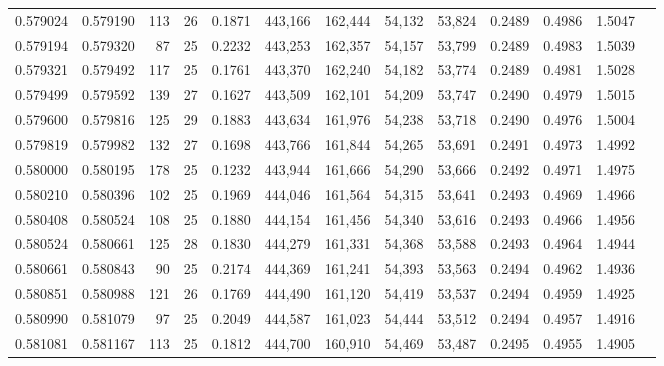\begin{tabular}{rrrrrrrrrrrrr}
0.579024 & 0.579190 &   113 &  26 &                                     0.1871 & 443,166 & 162,444 &  54,132 &  53,824 & 0.2489 & 0.4986 & 1.5047 \\
0.579194 & 0.579320 &    87 &  25 &                                     0.2232 & 443,253 & 162,357 &  54,157 &  53,799 & 0.2489 & 0.4983 & 1.5039 \\
0.579321 & 0.579492 &   117 &  25 &                                     0.1761 & 443,370 & 162,240 &  54,182 &  53,774 & 0.2489 & 0.4981 & 1.5028 \\
0.579499 & 0.579592 &   139 &  27 &                                     0.1627 & 443,509 & 162,101 &  54,209 &  53,747 & 0.2490 & 0.4979 & 1.5015 \\
0.579600 & 0.579816 &   125 &  29 &                                     0.1883 & 443,634 & 161,976 &  54,238 &  53,718 & 0.2490 & 0.4976 & 1.5004 \\
0.579819 & 0.579982 &   132 &  27 &                                     0.1698 & 443,766 & 161,844 &  54,265 &  53,691 & 0.2491 & 0.4973 & 1.4992 \\
0.580000 & 0.580195 &   178 &  25 &                                     0.1232 & 443,944 & 161,666 &  54,290 &  53,666 & 0.2492 & 0.4971 & 1.4975 \\
0.580210 & 0.580396 &   102 &  25 &                                     0.1969 & 444,046 & 161,564 &  54,315 &  53,641 & 0.2493 & 0.4969 & 1.4966 \\
0.580408 & 0.580524 &   108 &  25 &                                     0.1880 & 444,154 & 161,456 &  54,340 &  53,616 & 0.2493 & 0.4966 & 1.4956 \\
0.580524 & 0.580661 &   125 &  28 &                                     0.1830 & 444,279 & 161,331 &  54,368 &  53,588 & 0.2493 & 0.4964 & 1.4944 \\
0.580661 & 0.580843 &    90 &  25 &                                     0.2174 & 444,369 & 161,241 &  54,393 &  53,563 & 0.2494 & 0.4962 & 1.4936 \\
0.580851 & 0.580988 &   121 &  26 &                                     0.1769 & 444,490 & 161,120 &  54,419 &  53,537 & 0.2494 & 0.4959 & 1.4925 \\
0.580990 & 0.581079 &    97 &  25 &                                     0.2049 & 444,587 & 161,023 &  54,444 &  53,512 & 0.2494 & 0.4957 & 1.4916 \\
0.581081 & 0.581167 &   113 &  25 &                                     0.1812 & 444,700 & 160,910 &  54,469 &  53,487 & 0.2495 & 0.4955 & 1.4905 \\

\end{tabular}
